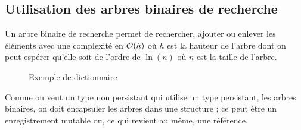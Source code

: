 \subsection{Utilisation des arbres binaires de recherche}
Un arbre binaire de recherche permet de rechercher, ajouter ou enlever les éléments avec une complexité en ${\cal O}(h)$ où $h$ est la hauteur de l'arbre dont on peut espérer qu'elle soit de l'ordre de $\ln(n)$ où $n$ est la taille de l'arbre.

\begin{figure*}[ht]
\centering
{}
\caption{Exemple de dictionnaire}
\end{figure*}

\newpage
Comme on veut un type non persistant qui utilise un type persistant, les arbres binaires, on doit encapsuler les arbres dans une structure ; ce peut être un enregistrement mutable ou, ce qui revient au même, une référence.

